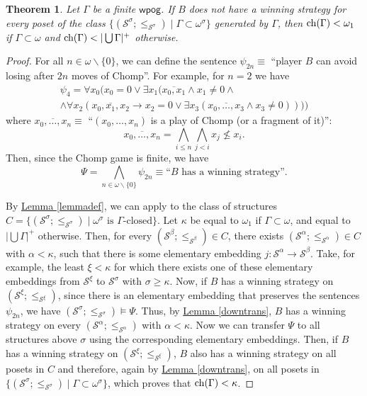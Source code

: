\documentclass[reqno]{amsart}
\newtheorem{theorem}{Theorem}[section]
\theoremstyle{definition}
\theoremstyle{definition}
\theoremstyle{plain} %
\begin{document}
\begin{theorem}\label{theoomeg1}
    Let $\Gamma$ be a finite $\mathsf{wpog}$. If $B$ does not have a winning strategy for every poset of the class $\{(\mathcal{S}^{\sigma};\leq_{\mathcal{S}^\sigma}) \mid \Gamma\subset\omega^{\sigma}\}$ generated by $\Gamma$, then $\textnormal{ch}(\Gamma)<\omega_1$ if $\Gamma\subset\omega$ and $\textnormal{ch}(\Gamma)<|\bigcup\Gamma|^+$ otherwise.
\end{theorem}
\begin{proof}
    For all $n\in\omega\backslash\{0\}$, we can define the sentence $\psi_{2n}\equiv$ ``player $B$ can avoid losing after $2n$ moves of Chomp''. For example, for $n=2$ we have \begin{gather*} \psi_4=\forall x_0(x_0=0\vee\exists x_1(\overline{x_0,x_1}\wedge x_1\neq0\wedge\\\wedge\forall x_2(\overline{x_0,x_1,x_2}\rightarrow x_2=0\vee\exists x_3(\overline{x_0,\dots,x_3}\wedge x_3\neq0)))) \end{gather*}
where $\overline{x_0,\dots,x_n}\equiv$ ``$(x_0,\dots,x_n)$ is a play of Chomp (or a fragment of it)'':
   $$ \overline{x_0,\dots,x_n}=\bigwedge_{i\leq n}\bigwedge_{j< i}x_{j}\not\leq x_{i}.$$ Then, since the Chomp game is finite, we have $$\Psi=\bigwedge_{n\in\omega\backslash\{0\}}\psi_{2n}\equiv\text{``$B$ has a winning strategy''}.$$

   By \hyperref[lemmadef]{Lemma \ref{lemmadef}}, we can apply \cite[Theorem 4.2]{Bagaria2012-BAGCN} to the class of structures $C=\{(\mathcal{S}^{\sigma};\leq_{\mathcal{S}^\sigma}) \mid \text{$\omega^\sigma$ is $\Gamma$-closed}\}$. Let $\kappa$ be equal to $\omega_1$ if $\Gamma \subset \omega$, and equal to $|\bigcup\Gamma|^+$ otherwise. Then, for every $(\mathcal{S}^\beta;\leq_{\mathcal{S}^\beta})\in C$, there exists $(\mathcal{S}^{\alpha};\leq_{\mathcal{S}^\alpha})\in C $ with $\alpha<\kappa$, such that there is some elementary embedding $j:\mathcal{S}^\alpha\to\mathcal{S}^\beta$. Take, for example, the least $\xi<\kappa$ for which there exists one of these elementary embeddings from $\mathcal{S}^\xi$ to $\mathcal{S}^\sigma$ with $\sigma\geq\kappa$. Now, if $B$ has a winning strategy on $(\mathcal{S}^\xi;\leq_{\mathcal{S}^\xi})$, since there is an elementary embedding that preserves the sentences $\psi_{2n}$, we have $(\mathcal{S}^\sigma;\leq_{\mathcal{S}^\sigma})\vDash\Psi$. Thus, by \hyperref[downtrans]{Lemma \ref{downtrans}}, $B$ has a winning strategy on every $(\mathcal{S}^\alpha;\leq_{\mathcal{S}^\alpha})$ with $\alpha<\kappa$. Now we can transfer $\Psi$ to all structures above $\sigma$ using the corresponding elementary embeddings. Then, if $B$ has a winning strategy on $(\mathcal{S}^\xi;\leq_{\mathcal{S}^\xi})$, $B$ also has a winning strategy on all posets in $ C$ and therefore, again by \hyperref[downtrans]{Lemma \ref{downtrans}}, on all posets in $\{(\mathcal{S}^{\sigma};\leq_{\mathcal{S}^\sigma}) \mid \Gamma\subset\omega^{\sigma}\}$, which proves that $\textnormal{ch}(\Gamma)<\kappa$.
\end{proof}
\end{document}
